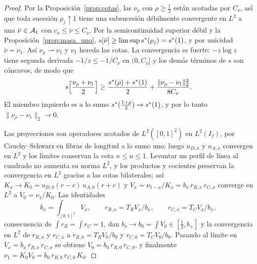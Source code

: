 \begin{proof}
Por la Proposición~\ref{prop:cotas}, las $\nu_\rho$ con $\rho\ge\frac12$ están acotadas por
$C_\nu$, así que toda sucesión $\rho_j\uparrow1$ tiene una subsucesión débilmente convergente en
$L^2$ a una $\bar\nu\in{\mathcal{A}}_1$ con $c_\nu\le\bar\nu\le C_\nu$. Por la semicontinuidad superior débil y
la Proposición~\ref{prop:masa_uno}, $s[\bar\nu]\ge\limsup s^{*}(\rho_j)=s^{*}(1)$, y por unicidad
$\bar\nu=\nu_1$. Así $\nu_\rho\rightharpoonup\nu_1$ y $\nu_1$ hereda las cotas. La convergencia es
fuerte: $-z\log z$ tiene segunda derivada $-1/z\le-1/C_\nu$ en $(0,C_\nu]$ y los demás términos de $s$
son cóncavos, de modo que
\[
 s\Bigl[\frac{\nu_\rho+\nu_1}2\Bigr]\ge\frac{s^{*}(\rho)+s^{*}(1)}2+\frac{\|\nu_\rho-\nu_1\|_2^2}{8C_\nu}.
\]
El miembro izquierdo es a lo sumo $s^{*}(\frac{1+\rho}2)\to s^{*}(1)$, y por lo tanto
$\|\nu_\rho-\nu_1\|_2\to0$.

Las proyecciones son operadores acotados de $L^2([0,1]^2)$ en $L^2(I_f)$, por Cauchy--Schwarz en
fibras de longitud a lo sumo uno; luego $u_{D,x}$ y $u_{A,x}$ convergen en $L^2$ y los límites
conservan la cota $\kappa\le u\le1$. Levantar un perfil de línea al cuadrado no aumenta su norma
$L^2$, y los productos y cocientes preservan la convergencia en $L^2$ gracias a las cotas
bilaterales; así $K_x\to K_0=u_{D,0}(r-c)\,u_{A,0}(r+c)$ y $V_x=\nu_{1-x}/K_x=b_x\,r_{R,x}\,r_{C,x}$
converge en $L^2$ a $V_0=\nu_1/K_0$. Las identidades
\begin{equation}\label{eq:identidades_V}
 b_x=\int_{[0,1]^2}V_x,\qquad r_{R,x}=T_RV_x/b_x,\qquad r_{C,x}=T_CV_x/b_x,
\end{equation}
consecuencia de $\int r_R=\int r_C=1$, dan $b_x\to b_0=\int V_0\in[\frac12,b_+]$ y la convergencia en
$L^2$ de $r_{R,x}$ y $r_{C,x}$ a $r_{R,0}=T_RV_0/b_0$ y $r_{C,0}=T_CV_0/b_0$. Pasando al límite en
$V_x=b_x\,r_{R,x}\,r_{C,x}$ se obtiene $V_0=b_0\,r_{R,0}\,r_{C,0}$, y finalmente
$\nu_1=K_0V_0=b_0\,r_{R,0}\,r_{C,0}\,K_0$.
\end{proof}

